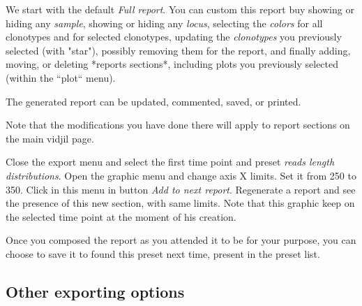 
We start with the default \textit{Full report}.
You can custom this report buy showing or hiding any \textit{sample},
showing or hiding any \textit{locus}, selecting the \textit{colors} for all clonotypes and for selected clonotypes,
updating the \textit{clonotypes} you previously selected (with "star"),  possibly removing them for the report,
and finally adding, moving, or deleting *reports sections*, including plots you previously selected (within the “plot“ menu).






The generated report can be updated, commented, saved, or printed.


Note that the modifications you have done there will apply to report sections on the main vidjil page.


Close the export menu and select the first time point and preset \textit{reads length distributions}.
Open the graphic menu and change axis X limits. Set it from 250 to 350.
Click in this menu in button \textit{Add to next report}. 
Regenerate a report and see the presence of this new section, with same limits.
Note that this graphic keep on the selected time point at the moment of his creation.

Once you composed the report as you attended it to be for your purpose, you can choose to save it to found this preset next time, present in the preset list.

\subsection{Other exporting options}

